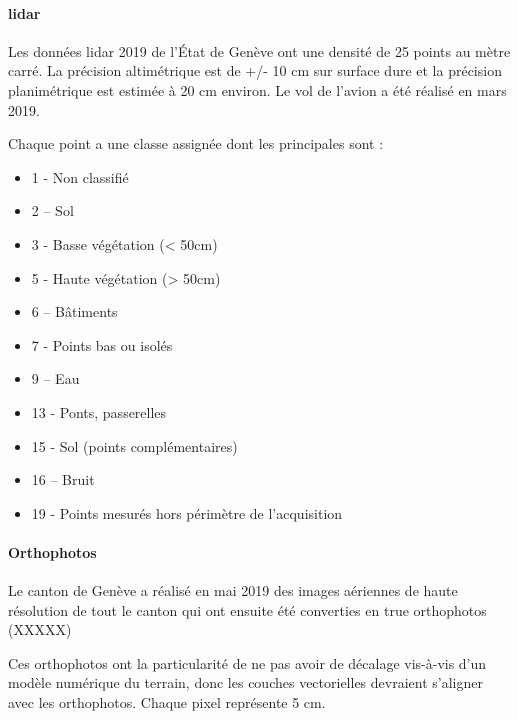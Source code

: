{\paragraph{\gls{lidar}}

\par{Les données \gls{lidar} 2019 \cite{sitg_nuages_nodate} de l'État de Genève ont une densité de 25 points au mètre carré. La précision altimétrique est de +/- 10 cm sur surface dure et la précision planimétrique est estimée à 20 cm environ. Le vol de l'avion a été réalisé en mars 2019.}

Chaque point a une classe assignée dont les principales sont :
\begin{itemize}
    \item 1 - Non classifié
    \item 2 – Sol
    \item 3 - Basse végétation (< 50cm)
    \item 5 - Haute végétation (> 50cm)
    \item 6 – Bâtiments
    \item 7 - Points bas ou isolés
    \item 9 – Eau
    \item 13 - Ponts, passerelles
    \item 15 - Sol (points complémentaires)
    \item 16 – Bruit
    \item 19 - Points mesurés hors périmètre de l'acquisition
\end{itemize}

\paragraph{Orthophotos}
\par{Le canton de Genève a réalisé en mai 2019 des images aériennes de haute résolution \cite{sitg_orthophotos_nodate} de tout le canton qui ont ensuite été converties en true orthophotos (XXXXX)}
\par{Ces orthophotos ont la particularité de ne pas avoir de décalage vis-à-vis d'un modèle numérique du terrain, donc les couches vectorielles devraient s'aligner avec les orthophotos. Chaque pixel représente 5 cm.}

}
